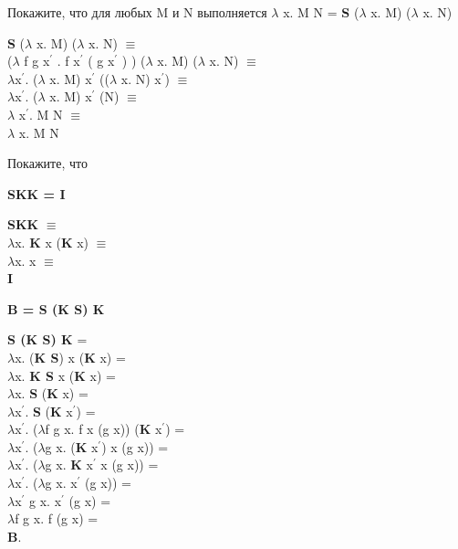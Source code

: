 \documentclass[a4paper,12pt]{article} %
\begin{document}
\begin{enumerate}
\begin{enumerate}
\end{enumerate}

{\item Покажите, что для любых M и N выполняется $\lambda$ x. M N = \textbf{S} ($\lambda$ x. M) ($\lambda$ x. N)}

    \begin{adjustwidth}{1em}{0pt}
    \textbf{S} ($\lambda$ x. M) ($\lambda$ x. N) $\equiv$ \\
    ($\lambda$ f g x$^\prime$ . f x$^\prime$ ( g x$^\prime$ ) ) ($\lambda$ x. M) ($\lambda$ x. N) $\equiv$ \\
    $\lambda$x$^\prime$. ($\lambda$ x. M) x$^\prime$ (($\lambda$ x. N) x$^\prime$) $\equiv$ \\
    $\lambda$x$^\prime$. ($\lambda$ x. M) x$^\prime$ (N) $\equiv$ \\
    $\lambda$ x$^\prime$. M N $\equiv$ \\
    $\lambda$ x. M N
    \end{adjustwidth}


{\item Покажите, что}

\begin{enumerate}

{\item \textbf{SKK = I}}

    \textbf{SKK} $\equiv$ \\
    $\lambda$x. \textbf{K} x (\textbf{K} x) $\equiv$ \\
    $\lambda$x. x $\equiv$ \\
    \textbf{I}


{\item \textbf{B = S (K S) K}}

    \textbf{S (K S) K} = \\
    $\lambda$x. (\textbf{K S}) x (\textbf{K} x) = \\
    $\lambda$x. \textbf{K S} x (\textbf{K} x) = \\
    $\lambda$x. \textbf{S} (\textbf{K} x) = \\
    $\lambda$x$^\prime$. \textbf{S} (\textbf{K} x$^\prime$) = \\
    $\lambda$x$^\prime$. ($\lambda$f g x. f x (g x)) (\textbf{K} x$^\prime$) = \\
    $\lambda$x$^\prime$. ($\lambda$g x. (\textbf{K} x$^\prime$) x (g x)) = \\
    $\lambda$x$^\prime$. ($\lambda$g x. \textbf{K} x$^\prime$ x (g x)) = \\
    $\lambda$x$^\prime$. ($\lambda$g x. x$^\prime$ (g x)) = \\
    $\lambda$x$^\prime$ g x. x$^\prime$ (g x) = \\
    $\lambda$f g x. f (g x) = \\
\textbf{B}.


\end{enumerate}
\end{enumerate}
\end{document}
